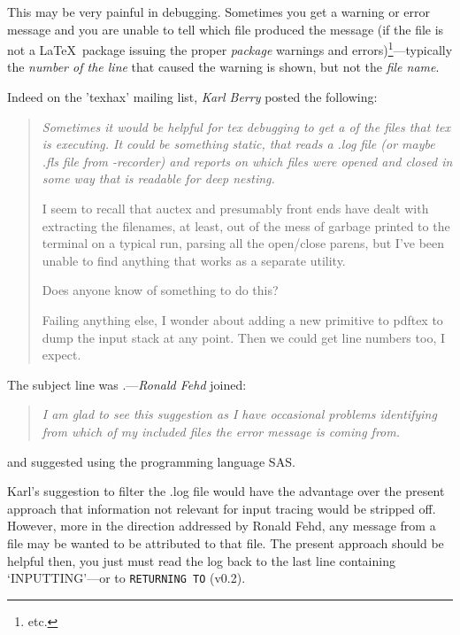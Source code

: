 \documentclass[fleqn]{article}%
\begin{document}
This may be very painful in debugging. Sometimes you get a warning or 
error message and you are unable to tell which file produced the 
message (if the file is not a \LaTeX\ package issuing the proper 
\emph{package} warnings and errors)\footnote{ 
etc.}---typically the \emph{number of the line} that caused the 
warning is shown, but not the \emph{file name}.

Indeed on the 'texhax' mailing list, \emph{Karl Berry} posted the 
following:    %
\begin{quote}\itshape\small
  Sometimes it would be helpful for tex debugging to get a 
   of the files that tex is executing. 
  It could be something static, that
  reads a .log file (or maybe .fls file from -recorder) and reports on
  which files were opened and closed in some way that is readable for deep
  nesting.
  
  I seem to recall that auctex and presumably front ends have dealt with
  extracting the filenames, at least, out of the mess of garbage printed
  to the terminal on a typical run, parsing all the open/close parens, but
  I've been unable to find anything that works as a separate utility.
  
  Does anyone know of something to do this?
  
  Failing anything else, I wonder about adding a new primitive to pdftex
  to dump the input stack at any point.  Then we could get line numbers
  too, I expect.
\end{quote}
The subject line was \textit{}.---\emph{Ronald Fehd} 
joined:
\begin{quote}\itshape\small
  I am glad to see this suggestion as I have occasional problems
  identifying from which of my included files the error message is coming
  from.
\end{quote}
and suggested using the programming language SAS.

Karl's suggestion to filter the .log file would have the advantage 
over the present approach that information not relevant for input 
tracing would be stripped off. However, more in the direction 
addressed by Ronald Fehd, any message from a file may be wanted to be 
attributed to that file. The present approach should be helpful then, 
you just must read the log back to the last line containing 
`INPUTTING'---or to \texttt{RETURNING TO} (v0.2). 
\end{document}
